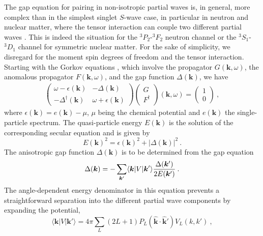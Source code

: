 \documentclass[rmp,aps,floatfix]{revtex4}
\begin{document}
The gap equation for pairing in non-isotropic partial waves is, in general,
more complex than in the simplest singlet $S$-wave case, 
in particular in neutron and 
nuclear matter, where the tensor interaction can couple two 
different partial waves \cite{tam70,taka93,bls95}. 
This is indeed the situation for the $^3P_2$-$^3F_2$ neutron channel
or the $^3S_1$-$^3D_1$ channel for symmetric nuclear matter. 
For the sake of simplicity, we disregard for the moment
spin degrees of freedom and the tensor interaction.
Starting  with the Gorkov equations \cite{gorkov}, 
which involve the propagator
$G(\bm{k},\omega)$, the anomalous propagator $F(\bm{k},\omega)$, and the
gap function $\Delta(\bm{k})$, we have 
\begin{eqnarray}
 \left( \begin{array}{rr} \omega-\epsilon(\bm{k}) & -\Delta(\bm{k}) \\ 
  -\Delta^\dagger(\bm{k}) & \omega+\epsilon(\bm{k})
 \end{array} \right)
 \left(\begin{array}{c} G \\ F^\dagger \end{array}\right)(\bm{k},\omega) =
 \left( \begin{array}{c} 1 \\ 0 \end{array} \right) \:,
  \label{eq:gorkoveq}
\end{eqnarray}
where $\epsilon(\bm{k}) = e(\bm{k}) - \mu$, $\mu$ being the 
chemical potential and $e(\bm{k})$ the single-particle spectrum. 
The quasi-particle energy $E(\bm{k})$ is the solution of the corresponding
secular equation and is given by
\begin{equation}
  E(\bm{k})^2 = \epsilon(\bm{k})^2 + |\Delta(\bm{k})|^2 \:.
 \label{eq:qua1}
\end{equation}
The anisotropic gap function $\Delta(\bm{k})$ 
is to be determined from the gap
equation
\begin{equation}
  \Delta(\bm{k}) = - \sum_{\bm{k}'} \langle \bm{k} | V | \bm{k}' 
\rangle
  {\Delta(\bm{k}')\over 2E(\bm{k}') } \:.
\end{equation}
The angle-dependent energy denominator in this equation prevents 
a straightforward separation into the different partial wave components
by expanding the potential,
\begin{equation}
  \langle \bm{k} | V | \bm{k}' \rangle = 
  4\pi \sum_L (2L+1) P_L(\bm{\hat{k}\cdot\hat{k}'}) V_L(k,k') \:,
\end{equation}
\end{document}
